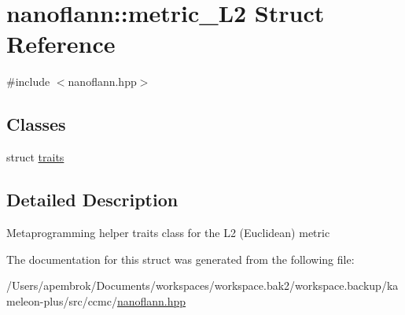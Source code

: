\hypertarget{structnanoflann_1_1metric___l2}{\section{nanoflann\-:\-:metric\-\_\-\-L2 Struct Reference}
\label{structnanoflann_1_1metric___l2}
}


{\ttfamily \#include $<$nanoflann.\-hpp$>$}

\subsection*{Classes}
\begin{DoxyCompactItemize}
\item 
struct \hyperlink{structnanoflann_1_1metric___l2_1_1traits}{traits}
\end{DoxyCompactItemize}


\subsection{Detailed Description}
Metaprogramming helper traits class for the L2 (Euclidean) metric 

The documentation for this struct was generated from the following file\-:\begin{DoxyCompactItemize}
\item 
/\-Users/apembrok/\-Documents/workspaces/workspace.\-bak2/workspace.\-backup/kameleon-\/plus/src/ccmc/\hyperlink{nanoflann_8hpp}{nanoflann.\-hpp}\end{DoxyCompactItemize}
